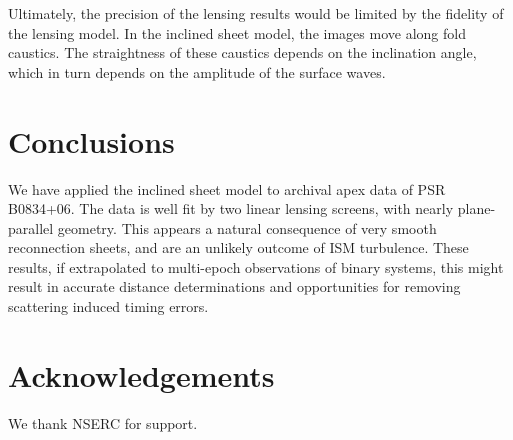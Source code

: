 \documentclass[useAMS,usenatbib]{mn2e}
\begin{document}
Ultimately, the precision of the lensing results would be limited by
the fidelity of the lensing model.  In the inclined sheet model, the
images move along fold caustics.  The straightness of these caustics
depends on the inclination angle, which in turn depends on the
amplitude of the surface waves.  

\section{Conclusions}

We have applied the \citep{2014MNRAS.442.3338P} inclined
sheet model to archival apex data of PSR B0834+06.  The data is well
fit by two linear lensing screens, with nearly plane-parallel
geometry.  This appears a natural consequence of very smooth
reconnection sheets, and are an unlikely outcome of ISM turbulence.
These results, if extrapolated to multi-epoch observations of binary
systems, this might result in accurate distance determinations and
opportunities for removing scattering induced timing errors.


\section{Acknowledgements}

We thank NSERC for support.


\newcommand{\araa}{ARA\&A}   %
\newcommand{\afz}{Afz}       %
\newcommand{\aj}{AJ}         %
\newcommand{\azh}{AZh}       %
\newcommand{\aaa}{A\&A}      %
\newcommand{\aas}{A\&AS}     %
\newcommand{\aar}{A\&AR}     %
\newcommand{\apj}{ApJ}       %
\newcommand{\apjs}{ApJS}     %
\newcommand{\apjl}{ApJ}      %
\newcommand{\apss}{Ap\&SS}   %
\newcommand{\baas}{BAAS}     %
\newcommand{\jaa}{JA\&A}     %
\newcommand{\mnras}{MNRAS}   %
\newcommand{\nat}{Nat}       %
\newcommand{\pasj}{PASJ}     %
\newcommand{\pasp}{PASP}     %
\newcommand{\paspc}{PASPC}   %
\newcommand{\qjras}{QJRAS}   %
\newcommand{\sci}{Sci}       %
\newcommand{\solphys}{Solar Physics}       %
\newcommand{\sova}{SvA}      %
\newcommand{\aap}{A\&A}
\newcommand\jcap{{J. Cosmology Astropart. Phys.}}%
\newcommand{\prd}{Phys. Rev. D}






\label{lastpage}
\end{document}
